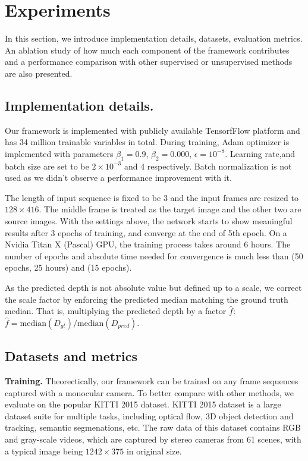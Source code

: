 \section{Experiments}
\label{sec:experiments}

In this section, we introduce implementation details, datasets, evaluation metrics. An ablation study of how much each component of the framework contributes and a performance comparison with other supervised or unsupervised methods are also presented.

\subsection{Implementation details.}

Our framework is implemented with publicly available TensorfFlow \cite{abadi2016tensorflow} platform and has 34 million trainable variables in total. During training, Adam optimizer is implemented with parameters $\beta_1 = 0.9$, $\beta_2=0.000$, $\epsilon=10^{-8}$. Learning rate,and batch size are set to be $2\times10^{-3}$ and 4 respectively. Batch normalization \cite{ioffe2015batch} is not used as we didn't observe a performance improvement with it.

The length of input sequence is fixed to be 3 and the input frames are resized to $128 \times 416$. The middle frame is treated as the target image and the other two are source images. With the settings above, the network starts to show meaningful results after 3 epochs of training, and converge at the end of 5th epoch. On a Nvidia Titan X (Pascal) GPU, the training process takes around 6 hours. The number of epochs and absolute time needed for convergence is much less than \cite{godard2016unsupervised} (50 epochs, 25 hours) and \cite{zhou2017unsupervised} (15 epochs).

As the predicted depth is not absolute value but defined up to a scale, we correct the scale factor by enforcing the predicted median matching the ground truth median. That is, multiplying the predicted depth by a factor $\hat{f}$: $\hat{f} = \mathrm{median}(D_{gt}) / \mathrm{median}(D_{pred})$. 

\subsection{Datasets and metrics}
\textbf{Training.}
Theorectically, our framework can be trained on any frame sequences captured with a monocular camera. To better compare with other methods, we evaluate on the popular KITTI 2015 \cite{geiger2012we} dataset. KITTI 2015 dataset is a large dataset suite for multiple tasks, including optical flow, 3D object detection and tracking, semantic segmenations, etc. The raw data of this dataset contains RGB and gray-scale videos, which are captured by stereo cameras from 61 scenes, with a typical image being $1242 \times 375$ in original size.

